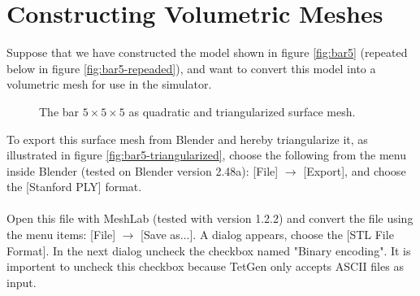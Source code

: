 
\chapter{Constructing Volumetric Meshes}
\label{sec:constructing-meshes}
Suppose that we have constructed the model shown in figure \vref{fig:bar5}
(repeated below in figure \ref{fig:bar5-repeaded}), and want to
convert this model into a volumetric mesh for use in the simulator.

\begin{figure}
  \centering
  \caption{The bar $5 \times 5 \times 5$ as quadratic and triangularized
    surface mesh.}
  \label{fig:bar}
\end{figure}

To export this surface mesh from Blender and hereby triangularize it,
as illustrated in figure \vref{fig:bar5-triangularized}, choose the
following from the menu inside Blender (tested on Blender version 2.48a):
[File] $\rightarrow$ [Export], and choose the [Stanford PLY] format. \\

 \\

Open this file with MeshLab (tested with version 1.2.2) and convert
the file using the menu items: [File] $\rightarrow$ [Save as...]. A
dialog appears, choose the [STL File Format]. In the next dialog
uncheck the checkbox named  "Binary encoding". It is importent to
uncheck this checkbox because TetGen only accepts ASCII files as input. \\

